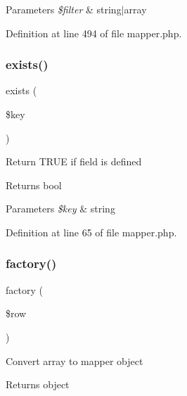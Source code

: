 \begin{DoxyParams}{Parameters}
{\em \$filter} & string$\vert$array \\
\hline
\end{DoxyParams}


Definition at line 494 of file mapper.\+php.

\hypertarget{class_d_b_1_1_s_q_l_1_1_mapper_ace1ae5be37bf26c172cc7ea4e1a65e26}{}\label{class_d_b_1_1_s_q_l_1_1_mapper_ace1ae5be37bf26c172cc7ea4e1a65e26} 
\subsubsection{\texorpdfstring{exists()}{exists()}}
{\footnotesize\ttfamily exists (\begin{DoxyParamCaption}\item[{}]{\$key }\end{DoxyParamCaption})}

Return T\+R\+UE if field is defined \begin{DoxyReturn}{Returns}
bool 
\end{DoxyReturn}

\begin{DoxyParams}{Parameters}
{\em \$key} & string \\
\hline
\end{DoxyParams}


Definition at line 65 of file mapper.\+php.

\hypertarget{class_d_b_1_1_s_q_l_1_1_mapper_a60e4b1320f31f4049ad7867bd739c14d}{}\label{class_d_b_1_1_s_q_l_1_1_mapper_a60e4b1320f31f4049ad7867bd739c14d} 
\subsubsection{\texorpdfstring{factory()}{factory()}}
{\footnotesize\ttfamily factory (\begin{DoxyParamCaption}\item[{}]{\$row }\end{DoxyParamCaption})\hspace{0.3cm}{\ttfamily [protected]}}

Convert array to mapper object \begin{DoxyReturn}{Returns}
object 
\end{DoxyReturn}

